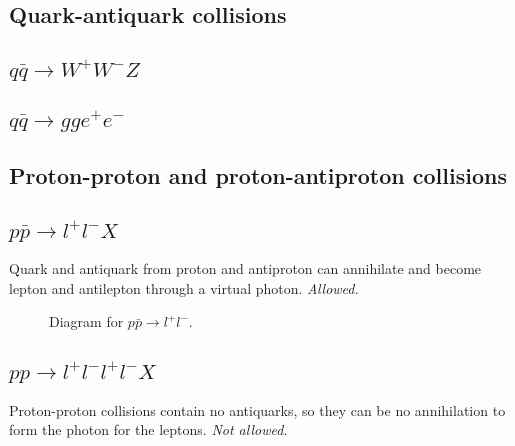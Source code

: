 \documentclass[11pt]{article}
\begin{document}
\begin{multicols}{2}
\subsection*{Quark-antiquark collisions}

\subsection{$q \bar{q} \rightarrow W^+ W^- Z$}

\subsection{$q \bar{q} \rightarrow gg e^+ e^-$}


\subsection*{Proton-proton and proton-antiproton collisions}

\subsection{$p \bar{p} \rightarrow l^+ l^- X$}
\begin{flushleft}
Quark and antiquark from proton and antiproton can annihilate and become lepton and antilepton through a virtual photon. \textit{Allowed.}
\begin{figure}[H]
\centering
{}
\caption{Diagram for $p \bar{p} \rightarrow l^+ l^-$.}
\end{figure}
\end{flushleft}

\subsection{$pp \rightarrow l^+ l^- l^+ l^- X$}
Proton-proton collisions contain no antiquarks, so they can be no annihilation to form the photon for the leptons. \textit{Not allowed.}


\end{multicols}
\end{document}
